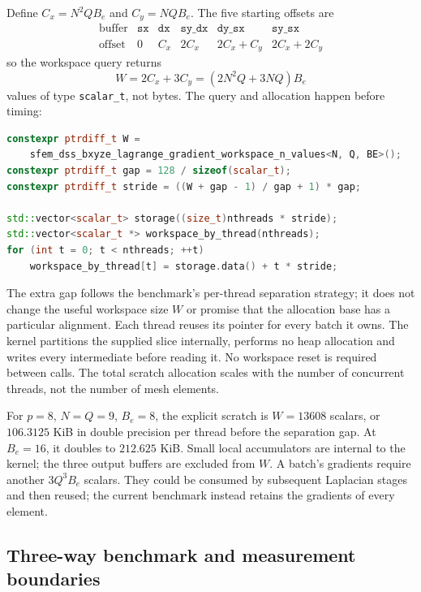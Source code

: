 \documentclass[11pt]{article}
\begin{document}
Define \(C_x=N^2QB_e\) and \(C_y=NQB_e\). The five starting offsets are
\[
\begin{array}{c|ccccc}
\text{buffer} & \texttt{sx} & \texttt{dx} & \texttt{sy\_dx}
 & \texttt{dy\_sx} & \texttt{sy\_sx}\\
\hline
\text{offset} & 0 & C_x & 2C_x & 2C_x+C_y & 2C_x+2C_y
\end{array}
\]
so the workspace query returns
\[
 W=2C_x+3C_y=(2N^2Q+3NQ)B_e
\]
values of type \texttt{scalar\_t}, not bytes. The query and allocation happen
before timing:
\begin{lstlisting}[language=C++]
constexpr ptrdiff_t W =
    sfem_dss_bxyze_lagrange_gradient_workspace_n_values<N, Q, BE>();
constexpr ptrdiff_t gap = 128 / sizeof(scalar_t);
constexpr ptrdiff_t stride = ((W + gap - 1) / gap + 1) * gap;

std::vector<scalar_t> storage((size_t)nthreads * stride);
std::vector<scalar_t *> workspace_by_thread(nthreads);
for (int t = 0; t < nthreads; ++t)
    workspace_by_thread[t] = storage.data() + t * stride;
\end{lstlisting}
The extra gap follows the benchmark's per-thread separation strategy; it does
not change the useful workspace size \(W\) or promise that the allocation base
has a particular alignment. Each thread reuses its pointer for every batch it
owns. The kernel partitions the supplied slice internally, performs no heap
allocation and writes every intermediate before reading it. No workspace reset
is required between calls. The total scratch allocation scales with the number
of concurrent threads, not the number of mesh elements.

For \(p=8\), \(N=Q=9\), \(B_e=8\), the explicit scratch is
\(W=13608\) scalars, or \(106.3125\) KiB in double precision per thread
before the separation gap. At \(B_e=16\), it doubles to \(212.625\) KiB.
Small local accumulators are internal to the kernel; the three output buffers
are excluded from \(W\). A batch's gradients require another \(3Q^3B_e\)
scalars. They could be consumed by subsequent Laplacian stages and then reused;
the current benchmark instead retains the gradients of every element.

\subsection{Three-way benchmark and measurement boundaries}
\end{document}
